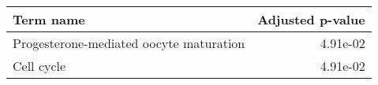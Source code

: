 \begin{tabular}{lr}
\toprule
                              Term name &  Adjusted p-value \\
\midrule
Progesterone-mediated oocyte maturation &          4.91e-02 \\
                             Cell cycle &          4.91e-02 \\
\bottomrule
\end{tabular}
